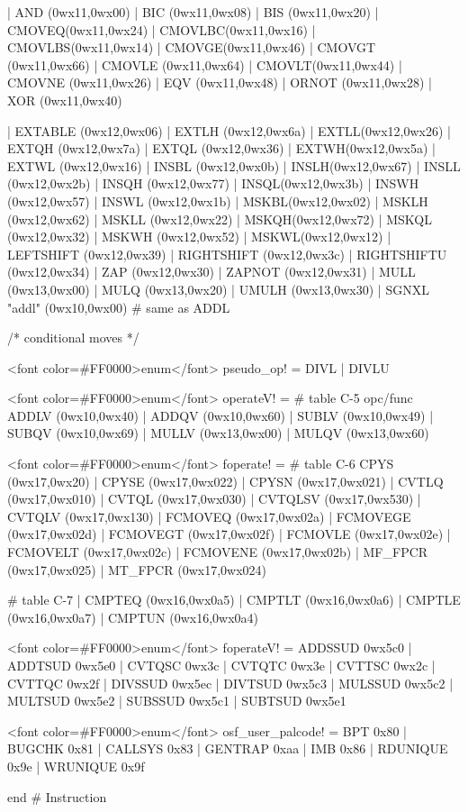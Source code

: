\begin{SML}
     | AND   (0wx11,0wx00) | BIC    (0wx11,0wx08) | BIS    (0wx11,0wx20)
     | CMOVEQ(0wx11,0wx24) | CMOVLBC(0wx11,0wx16) | CMOVLBS(0wx11,0wx14)
     | CMOVGE(0wx11,0wx46) | CMOVGT (0wx11,0wx66) | CMOVLE (0wx11,0wx64)
     | CMOVLT(0wx11,0wx44) | CMOVNE (0wx11,0wx26) | EQV (0wx11,0wx48)
     | ORNOT (0wx11,0wx28) | XOR    (0wx11,0wx40)

     | EXTABLE (0wx12,0wx06) | EXTLH  (0wx12,0wx6a) | EXTLL(0wx12,0wx26)
     | EXTQH (0wx12,0wx7a) | EXTQL  (0wx12,0wx36) | EXTWH(0wx12,0wx5a)
     | EXTWL (0wx12,0wx16) | INSBL  (0wx12,0wx0b) | INSLH(0wx12,0wx67)
     | INSLL (0wx12,0wx2b) | INSQH  (0wx12,0wx77) | INSQL(0wx12,0wx3b)
     | INSWH (0wx12,0wx57) | INSWL  (0wx12,0wx1b) | MSKBL(0wx12,0wx02)
     | MSKLH (0wx12,0wx62) | MSKLL  (0wx12,0wx22) | MSKQH(0wx12,0wx72)
     | MSKQL (0wx12,0wx32) | MSKWH  (0wx12,0wx52) | MSKWL(0wx12,0wx12)
     | LEFTSHIFT   (0wx12,0wx39) | RIGHTSHIFT    (0wx12,0wx3c) | RIGHTSHIFTU  (0wx12,0wx34)
     | ZAP   (0wx12,0wx30) | ZAPNOT (0wx12,0wx31)
     | MULL  (0wx13,0wx00)                        | MULQ (0wx13,0wx20)
                           | UMULH  (0wx13,0wx30) 
     | SGNXL "addl" (0wx10,0wx00) #  same as ADDL 

   /* conditional moves */ 
 
   <font color=#FF0000>enum</font> pseudo_op! = DIVL | DIVLU
 
   <font color=#FF0000>enum</font> operateV! = #  table C-5 opc/func 
        ADDLV (0wx10,0wx40) | ADDQV (0wx10,0wx60)
      | SUBLV (0wx10,0wx49) | SUBQV (0wx10,0wx69) 
      | MULLV (0wx13,0wx00) | MULQV (0wx13,0wx60)
 
   <font color=#FF0000>enum</font> foperate! =   #  table C-6 
      CPYS    (0wx17,0wx20)  | CPYSE (0wx17,0wx022)    | CPYSN   (0wx17,0wx021)
    | CVTLQ   (0wx17,0wx010) | CVTQL (0wx17,0wx030)    | CVTQLSV (0wx17,0wx530)
    | CVTQLV  (0wx17,0wx130)
    | FCMOVEQ (0wx17,0wx02a) | FCMOVEGE (0wx17,0wx02d) | FCMOVEGT (0wx17,0wx02f)
    | FCMOVLE (0wx17,0wx02e) | FCMOVELT (0wx17,0wx02c) | FCMOVENE (0wx17,0wx02b)
    | MF_FPCR (0wx17,0wx025) | MT_FPCR  (0wx17,0wx024)

                         #  table C-7 
    | CMPTEQ  (0wx16,0wx0a5) | CMPTLT (0wx16,0wx0a6)   | CMPTLE  (0wx16,0wx0a7)
    | CMPTUN  (0wx16,0wx0a4)

   <font color=#FF0000>enum</font> foperateV! = 
          ADDSSUD  0wx5c0
        | ADDTSUD  0wx5e0
        | CVTQSC   0wx3c
        | CVTQTC   0wx3e
        | CVTTSC   0wx2c
        | CVTTQC   0wx2f
        | DIVSSUD  0wx5ec
        | DIVTSUD  0wx5c3
        | MULSSUD  0wx5c2
        | MULTSUD  0wx5e2
        | SUBSSUD  0wx5c1
        | SUBTSUD  0wx5e1
 
   <font color=#FF0000>enum</font> osf_user_palcode! = 
      BPT 0x80 | BUGCHK 0x81 | CALLSYS 0x83 
    | GENTRAP 0xaa | IMB 0x86 | RDUNIQUE 0x9e | WRUNIQUE 0x9f

   end #  Instruction 
\end{SML}

